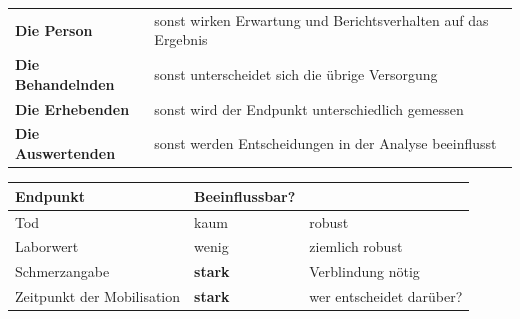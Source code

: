 \begin{merksatz}
\begin{center}
{\small
\renewcommand{\arraystretch}{1.5}
\begin{tabular}{@{}P{2.6cm}P{6.0cm}@{}}
\toprule
\textbf{Die Person} & sonst wirken Erwartung und Berichtsverhalten auf das Ergebnis\\
\textbf{Die Behandelnden} & sonst unterscheidet sich die übrige Versorgung\\
\textbf{Die Erhebenden} & sonst wird der Endpunkt unterschiedlich gemessen\\
\textbf{Die Auswertenden} & sonst werden Entscheidungen in der Analyse beeinflusst\\
\bottomrule
\end{tabular}}
\end{center}

\begin{center}
\begin{minipage}{0.88\textwidth}
\end{minipage}
\end{center}

\begin{center}
\renewcommand{\arraystretch}{1.48}
\begin{tabular}{@{}P{3.0cm}P{2.4cm}P{2.4cm}@{}}
\toprule
\textbf{Endpunkt} & \textbf{Beein\-flussbar?} & \\
\midrule
Tod & \textcolor{gruen}{kaum} & robust\\
Laborwert & \textcolor{gruen}{wenig} & ziemlich robust\\
Schmerzangabe & \textcolor{akzent}{\textbf{stark}} & \textcolor{akzent}{Verblindung nötig}\\
Zeitpunkt der Mobilisation & \textcolor{akzent}{\textbf{stark}} & wer entscheidet darüber?\\
\bottomrule
\end{tabular}
\end{center}

\begin{center}
\begin{minipage}{0.88\textwidth}
\end{minipage}
\end{center}
\end{merksatz}

